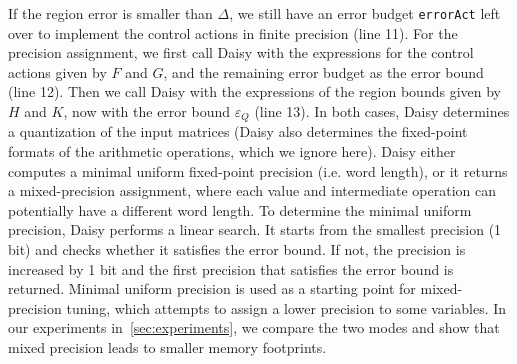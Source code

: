 If the region error is smaller than $\Delta$, we still have an error budget \texttt{errorAct} left
over to implement the control actions in finite precision (line 11).
For the precision assignment, we first call Daisy with the expressions for the
control actions given by $F$ and $G$, and the remaining error
budget as the error bound (line 12).
Then we call Daisy with the expressions of the region bounds given by $H$
and $K$, now with the error bound $\varepsilon_Q$ (line 13).
In both cases, Daisy determines a quantization of the input matrices (Daisy also
determines the fixed-point formats of the arithmetic operations, which we ignore here).
Daisy either computes a minimal uniform fixed-point precision (i.e. word length),
or it returns a mixed-precision assignment, where each value and
intermediate operation can potentially have a different word length.
To determine the minimal uniform precision, Daisy performs a linear search.
It starts from the smallest precision (1 bit) and checks whether it satisfies the
error bound. If not, the precision is increased by 1 bit and the first precision
that satisfies the error bound is returned.
Minimal uniform precision is used as a starting point for mixed-precision tuning,
which attempts to assign a lower precision to some variables. 
In our experiments in~\autoref{sec:experiments}, we compare the two modes and show
that mixed precision leads to smaller memory footprints.

